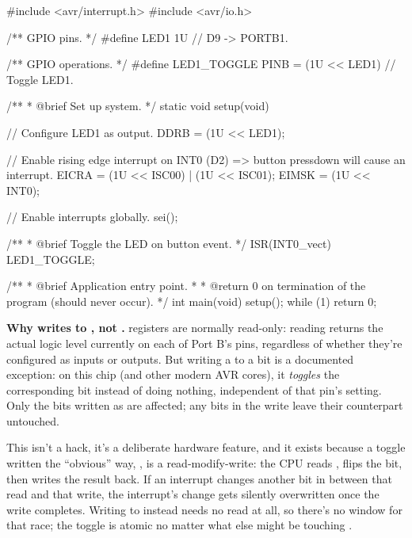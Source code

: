 
\begin{ccode}
#include <avr/interrupt.h>
#include <avr/io.h>

/** GPIO pins. */
#define LED1 1U // D9  -> PORTB1.

/** GPIO operations. */
#define LED1_TOGGLE PINB = (1U << LED1) // Toggle LED1.

/**
 * @brief Set up system.
 */
static void setup(void)
{
    // Configure LED1 as output.
    DDRB = (1U << LED1);

    // Enable rising edge interrupt on INT0 (D2) => button pressdown will cause an interrupt.
    EICRA = (1U << ISC00) | (1U << ISC01);
    EIMSK = (1U << INT0);

    // Enable interrupts globally.
    sei();
}

/**
 * @brief Toggle the LED on button event.
 */
ISR(INT0_vect) { LED1_TOGGLE; }

/**
 * @brief Application entry point.
 *
 * @return 0 on termination of the program (should never occur).
 */
int main(void)
{
    setup();
    while (1) {}
    return 0;
}
\end{ccode}

\textbf{Why  writes to , not .}  registers are
normally read-only: reading  returns the actual logic level currently on each of Port
B's pins, regardless of whether they're configured as inputs or outputs. But writing a  to a
 bit is a documented exception: on this chip (and other modern AVR cores), it
\emph{toggles} the corresponding  bit instead of doing nothing, independent of that
pin's  setting. Only the bits written as  are affected; any  bits in
the write leave their  counterpart untouched.

This isn't a hack, it's a deliberate hardware feature, and it exists because a toggle written the
``obvious'' way, , is a read-modify-write: the CPU reads ,
flips the bit, then writes the result back. If an interrupt changes another bit in 
between that read and that write, the interrupt's change gets silently overwritten once the write
completes. Writing to  instead needs no read at all, so there's no window for that race;
the toggle is atomic no matter what else might be touching .

